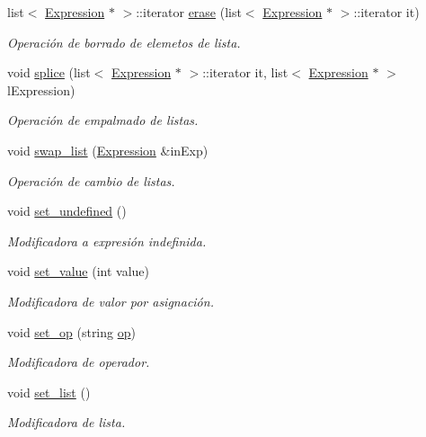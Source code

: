 \begin{DoxyCompactItemize}
list$<$ \hyperlink{class_expression}{Expression} $\ast$ $>$\+::iterator \hyperlink{class_expression_a3fcf4ce4c5efde7795a6b3b004abf0ad}{erase} (list$<$ \hyperlink{class_expression}{Expression} $\ast$ $>$\+::iterator it)
\begin{DoxyCompactList}\small\item\em Operación de borrado de elemetos de lista. \end{DoxyCompactList}\item 
void \hyperlink{class_expression_afcd885fc3562809ede2796b722bb4854}{splice} (list$<$ \hyperlink{class_expression}{Expression} $\ast$ $>$\+::iterator it, list$<$ \hyperlink{class_expression}{Expression} $\ast$ $>$ l\+Expression)
\begin{DoxyCompactList}\small\item\em Operación de empalmado de listas. \end{DoxyCompactList}\item 
void \hyperlink{class_expression_a1668a7770489da5f57801254c35557ee}{swap\+\_\+list} (\hyperlink{class_expression}{Expression} \&in\+Exp)
\begin{DoxyCompactList}\small\item\em Operación de cambio de listas. \end{DoxyCompactList}\item 
void \hyperlink{class_expression_a1d3ddfe83d20f47930792807e8b22248}{set\+\_\+undefined} ()
\begin{DoxyCompactList}\small\item\em Modificadora a expresión indefinida. \end{DoxyCompactList}\item 
void \hyperlink{class_expression_a307683cc3735bf81d823931aab2d64e0}{set\+\_\+value} (int value)
\begin{DoxyCompactList}\small\item\em Modificadora de valor por asignación. \end{DoxyCompactList}\item 
void \hyperlink{class_expression_adffd3a10200510c64055e550e9eebb1f}{set\+\_\+op} (string \hyperlink{class_expression_a30856695b46075ada151f6f6cdfb9fa8}{op})
\begin{DoxyCompactList}\small\item\em Modificadora de operador. \end{DoxyCompactList}\item 
void \hyperlink{class_expression_a66db516be4fa87d58df4806938676508}{set\+\_\+list} ()
\begin{DoxyCompactList}\small\item\em Modificadora de lista. \end{DoxyCompactList}\item 

\end{DoxyCompactItemize}
